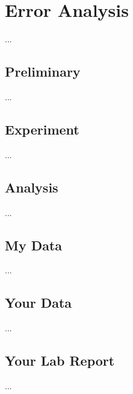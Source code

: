 \chapter{Error Analysis}
...
\section{Preliminary}
...
\section{Experiment}
...
\section{Analysis}
...
\section{My Data}
...
\section{Your Data}
...
\section{Your Lab Report}
...